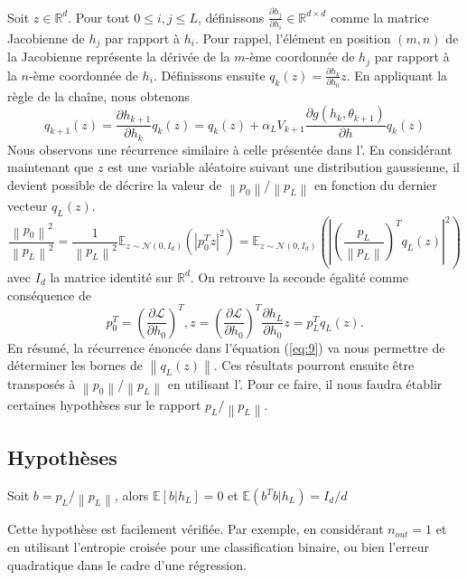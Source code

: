 Soit $z \in \mathbb{R}^d$. Pour tout $0 \leq i, j \leq L$, définissons $\frac{\partial h_j}{\partial h_i} \in \mathbb{R}^{d \times d}$ comme la matrice Jacobienne de $h_j$ par rapport à $h_i$. Pour rappel, l'élément en position $(m, n)$ de la Jacobienne représente la dérivée de la $m$-ème coordonnée de $h_j$ par rapport à la $n$-ème coordonnée de $h_i$. Définissons ensuite $q_k(z) = \frac{\partial h_k}{\partial h_0} z$. En appliquant la règle de la chaîne, nous obtenons
\begin{equation}\label{eq:9}
    q_{k+1}(z) = \frac{\partial h_{k+1}}{\partial h_k} q_k(z) = q_k(z) + \alpha _L V_{k+1} \frac{\partial g(h_k, \theta _{k+1})}{\partial h} q_k(z)
\end{equation}
Nous observons une récurrence similaire à celle présentée dans l'. En considérant maintenant que $z$ est une variable aléatoire suivant une distribution gaussienne, il devient possible de décrire la valeur de $\left\| p_0 \right\| / \left\| p_L \right\|$ en fonction du dernier vecteur $q_L(z)$.
\begin{equation}\label{eq:10}
    \frac{\left\| p_0 \right\| ^2}{\left\| p_L \right\| ^2} = \frac{1}{\left\| p_L \right\| ^2} \mathbb{E}_{z \sim \mathcal{N}(0, I_d)}(\left| p_0^T z  \right| ^2) = \mathbb{E}_{z \sim \mathcal{N}(0, I_d)}(\left| (\frac{p_L}{\left\| p_L \right\| })^T q_L(z) \right| ^2 )
\end{equation}
avec $ I_d $ la matrice identité sur $ \mathbb{R}^d $. On retrouve la seconde égalité comme conséquence de 
\[
    p_0^T = \left(\frac{\partial \mathscr{L}}{\partial h_0} \right)^T, z = (\frac{\partial \mathscr{L}}{\partial h_0} )^T \frac{\partial h_L}{\partial h_0} z = p_L^T  q_L(z)
.\]
En résumé, la récurrence énoncée dans l'équation (\ref{eq:9}) va nous permettre de déterminer les bornes de $\left\| q_L(z) \right\|$. Ces résultats pourront ensuite être transposés à $\left\| p_0 \right\| / \left\| p_L \right\|$ en utilisant l'. Pour ce faire, il nous faudra établir certaines hypothèses sur le rapport $p_L / \left\| p_L \right\|$.

\subsection*{Hypothèses}

\begin{assumption}\label{H3}
    Soit $ b= p_L / \left\| p_L \right\|  $, alors $ \mathbb{E}[b | h_L] = 0 $ et $ \mathbb{E}(b^T b | h_L) = I_d / d $
\end{assumption}
\begin{note}
    Cette hypothèse est facilement vérifiée. Par exemple, en considérant $n_{out} = 1$ et en utilisant l'entropie croisée pour une classification binaire, ou bien l'erreur quadratique dans le cadre d'une régression.
\end{note}

